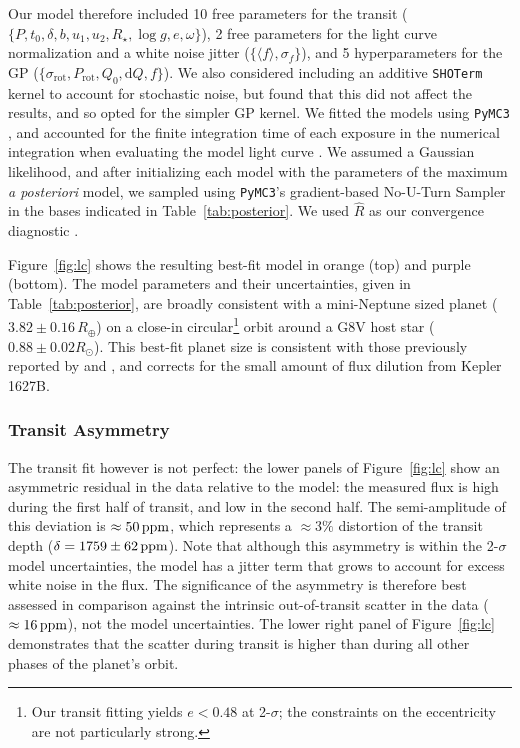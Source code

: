 \documentclass[12pt,modern,twocolumn,tighten,linenumbers,trackchanges]{aastex63}
\begin{document}
Our model therefore included 10 free parameters for the transit ($\{P,
t_0, \delta, b, u_1 ,u_2 ,R_\star, \log g, e, \omega \}$), 2 free
parameters for the light curve normalization and a white noise jitter
($\{\langle f \rangle, \sigma_f \}$), and 5 hyperparameters for the GP
($\{\sigma_{\mathrm{rot}}, P_{\mathrm{rot}}, Q_0, \mathrm{d}Q, f \}$).
We also considered including an additive \texttt{SHOTerm} kernel to
account for stochastic noise, but found that this did not affect the
results, and so opted for the simpler GP kernel.  We fitted the models
using \texttt{PyMC3} \citep{salvatier_2016_PyMC3,exoplanet:theano},
and accounted for the finite integration time of each exposure in the
numerical integration when evaluating the model light curve
\citep[see][]{kipping_binning_2010}.  We assumed a Gaussian
likelihood, and after initializing each model with the parameters of
the maximum {\it a posteriori} model, we sampled using
\texttt{PyMC3}'s gradient-based No-U-Turn Sampler
\citep{hoffman_no-u-turn_2014} in the bases indicated in
Table~\ref{tab:posterior}.  We used $\hat{R}$ as our convergence
diagnostic \citep{gelman_inference_1992}.

Figure~\ref{fig:lc} shows the resulting best-fit model in orange (top)
and purple (bottom).  The model parameters and their uncertainties,
given in Table~\ref{tab:posterior}, are broadly consistent with a
mini-Neptune sized planet ($3.82\pm0.16\,R_\oplus$) on a close-in
circular\footnote{ Our transit fitting yields $e<0.48$ at 2-$\sigma$;
the constraints on the eccentricity are not particularly strong.}
orbit around a G8V host star ($0.88 \pm 0.02 R_\odot$).  This best-fit
planet size is consistent with those previously reported by
\citet{morton_false_2016} and \citet{berger_2018_radii}, and
corrects for the small amount of flux dilution from Kepler\,1627B.

\subsubsection{Transit Asymmetry}
\label{subsec:asymmetry}
The transit fit however is not perfect: the lower panels of
Figure~\ref{fig:lc} show an asymmetric residual in the data relative
to the model: the measured flux is high during the first half of
transit, and low in the second half.  The semi-amplitude of this
deviation is $\approx50\,{\rm ppm}$, which represents a $\approx 3\%$
distortion of the transit depth ($\delta=1759\pm62\,{\rm ppm}$).  Note that
although this asymmetry is within the 2-$\sigma$ model uncertainties, the
model has a jitter term that grows to account for excess
white noise in the flux.  The significance of the asymmetry is
therefore best assessed in comparison against the intrinsic
out-of-transit scatter in the data ($\approx16\,{\rm ppm}$), not the model uncertainties.  The
lower right panel of Figure~\ref{fig:lc} demonstrates that the scatter during
transit is higher than during all other phases of the planet's orbit.
\end{document}
